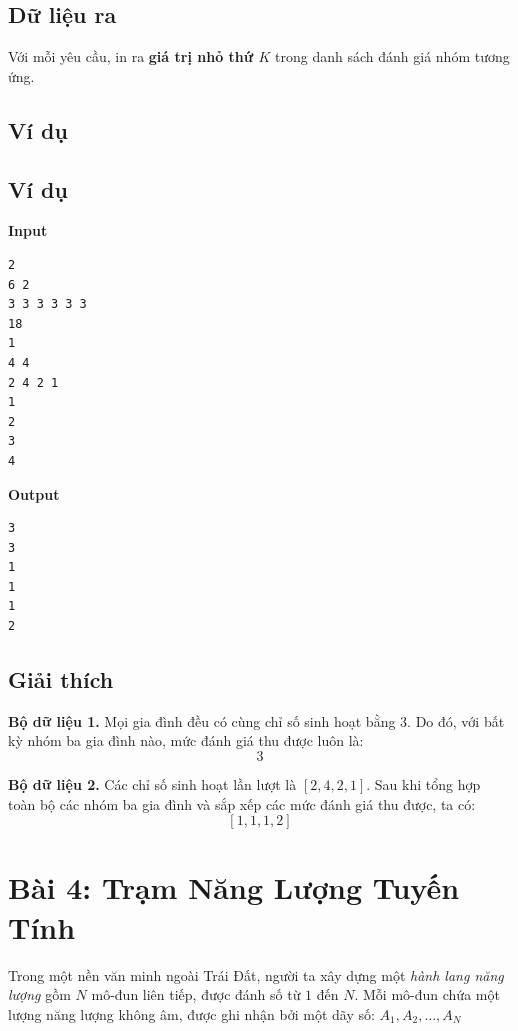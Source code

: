 \subsection*{Dữ liệu ra}

Với mỗi yêu cầu, in ra \textbf{giá trị nhỏ thứ $K$}
trong danh sách đánh giá nhóm tương ứng.

\subsection*{Ví dụ}

\subsection*{Ví dụ}

\noindent
\begin{minipage}[t]{0.48\textwidth}
\textbf{Input}
\begin{verbatim}
2
6 2
3 3 3 3 3 3
18
1
4 4
2 4 2 1
1
2
3
4
\end{verbatim}
\end{minipage}
\hfill
\begin{minipage}[t]{0.48\textwidth}
\textbf{Output}
\begin{verbatim}
3
3
1
1
1
2
\end{verbatim}
\end{minipage}


\subsection*{Giải thích}

\textbf{Bộ dữ liệu 1.}
Mọi gia đình đều có cùng chỉ số sinh hoạt bằng $3$.
Do đó, với bất kỳ nhóm ba gia đình nào,
mức đánh giá thu được luôn là:
\[
3
\]

\textbf{Bộ dữ liệu 2.}
Các chỉ số sinh hoạt lần lượt là $[2,4,2,1]$.
Sau khi tổng hợp toàn bộ các nhóm ba gia đình
và sắp xếp các mức đánh giá thu được, ta có:
\[
[1,1,1,2]
\]

\newpage

\section*{Bài 4: Trạm Năng Lượng Tuyến Tính}

Trong một nền văn minh ngoài Trái Đất, người ta xây dựng một \emph{hành lang năng lượng} gồm $N$ mô-đun liên tiếp, được đánh số từ $1$ đến $N$.
Mỗi mô-đun chứa một lượng năng lượng không âm, được ghi nhận bởi một dãy số: $A_1, A_2, \dots, A_N$

